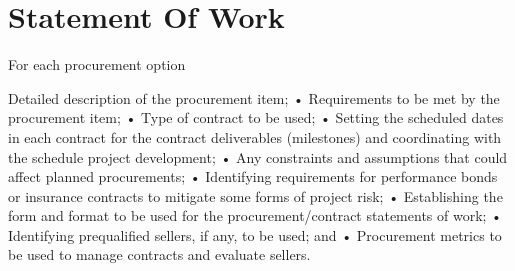 \section{Statement Of Work}
For each procurement option 

Detailed description of the procurement item;
• Requirements to be met by the procurement item;
• Type of contract to be used;
• Setting the scheduled dates in each contract for the contract deliverables (milestones) and coordinating with the schedule project development;
• Any constraints and assumptions that could affect planned procurements;
• Identifying requirements for performance bonds or insurance contracts to mitigate some forms of project risk;
• Establishing the form and format to be used for the procurement/contract statements of work;
• Identifying prequalified sellers, if any, to be used; and
• Procurement metrics to be used to manage contracts and evaluate sellers.

